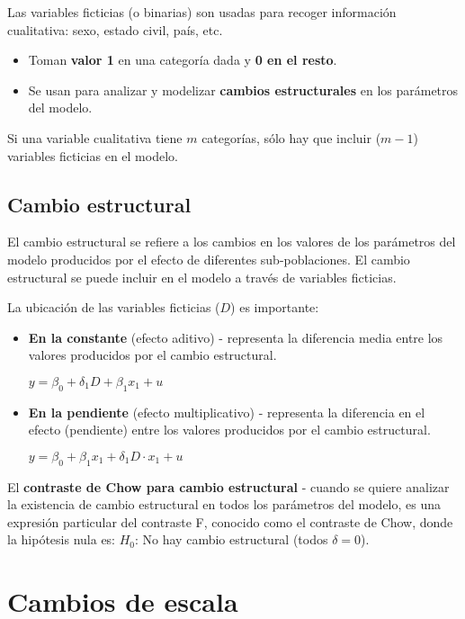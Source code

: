 \documentclass[10pt, a4paper, landscape]{extarticle}
\begin{document}
\begin{multicols}{3}
Las variables ficticias (o binarias) son usadas para recoger información cualitativa: sexo, estado civil, país, etc.

\begin{itemize}[leftmargin=*]
	\item Toman \textbf{valor 1} en una categoría dada y \textbf{0 en el resto}.
	\item Se usan para analizar y modelizar \textbf{cambios estructurales} en los parámetros del modelo.
\end{itemize}

Si una variable cualitativa tiene $m$ categorías, sólo hay que incluir ($m - 1$) variables ficticias en el modelo.

\subsection*{Cambio estructural}

El cambio estructural se refiere a los cambios en los valores de los parámetros del modelo producidos por el efecto de diferentes sub-poblaciones. El cambio estructural se puede incluir en el modelo a través de variables ficticias.

La ubicación de las variables ficticias ($D$) es importante:

\begin{itemize}[leftmargin=*]
	\item \textbf{En la constante} (efecto aditivo) - representa la diferencia media entre los valores producidos por el cambio estructural.
	\begin{center}
		$y = \beta_0 + \delta_1 D + \beta_1 x_1 + u$
	\end{center}
	\item \textbf{En la pendiente} (efecto multiplicativo) - representa la diferencia en el efecto (pendiente) entre los valores producidos por el cambio estructural.
	\begin{center}
		$y = \beta_0 + \beta_1 x_1 + \delta_1 D \cdot x_1 + u$
	\end{center}
\end{itemize}

El \textbf{contraste de Chow para cambio estructural} - cuando se quiere analizar la existencia de cambio estructural en todos los parámetros del modelo, es una expresión particular del contraste F, conocido como el contraste de Chow, donde la hipótesis nula es: $H_0$: No hay cambio estructural (todos $\delta = 0$).

\section*{Cambios de escala}


\end{multicols}
\end{document}
